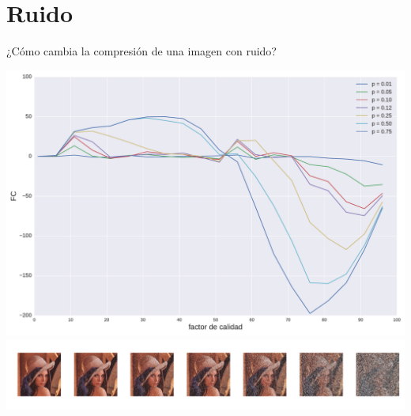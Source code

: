 \documentclass{beamer}
\begin{document}
\section{Ruido}    
\begin{frame}
    ¿Cómo cambia la compresión de una imagen con ruido?
\end{frame}

\begin{frame}
    \begin{center}
        \includegraphics[scale=0.2]{fig/lena_SP_plot.pdf} \\
        \vspace{3mm}
        \includegraphics[scale=0.2]{fig/lenas_SP_images.pdf}
    \end{center}
\end{frame}
\end{document}
